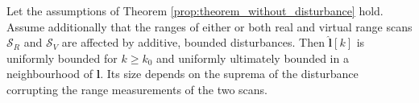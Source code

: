 \begin{theorem}
  \label{prop:theorem_with_disturbance} Let the assumptions of Theorem
  \ref{prop:theorem_without_disturbance} hold. Assume additionally that the
  ranges of either or both real and virtual range scans $\mathcal{S}_R$ and
  $\mathcal{S}_V$ are affected by additive, bounded disturbances. Then
  $\hat{\bm{l}}[k]$ is uniformly bounded for $k \geq k_0$ and uniformly
  ultimately bounded in a neighbourhood of $\bm{l}$. Its size depends on the
  suprema of the disturbance corrupting the range measurements of the two
  scans.
\end{theorem}
